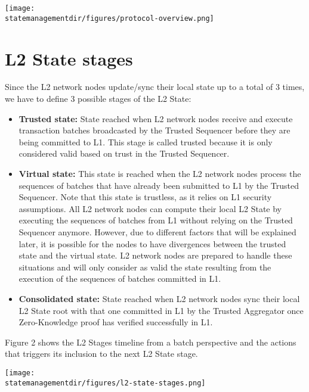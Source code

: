 \begin{center}
	\texttt{[image: \\statemanagementdir/figures/protocol-overview.png]}
	
\end{center}



\section{L2 State stages}

Since the L2 network nodes update/sync their local state up to a total of 3 times, we have to define 3 possible stages of the L2 State:

\begin{itemize}
	\item \textbf{Trusted state:} State reached when L2 network nodes receive and execute transaction batches broadcasted by the Trusted Sequencer before they are being committed to L1. This stage is called trusted because it is only considered valid based on trust in the Trusted Sequencer.
	

	\item \textbf{Virtual state:} This state is reached when the L2 network nodes process the sequences of batches that have already been submitted to L1 by the Trusted Sequencer. Note that this state is trustless, as it relies on L1 security assumptions. All L2 network nodes can compute their local L2 State by executing the sequences of batches from L1 without relying on the Trusted Sequencer anymore. However, due to different factors that will be explained later, it is possible for the nodes to have divergences between the trusted state and the virtual state. L2 network nodes are prepared to handle these situations and will only consider as valid the state resulting from the execution of the sequences of batches committed in L1.
	\item \textbf{Consolidated state:} State reached when L2 network nodes sync their local L2 State root with that one committed in L1 by the Trusted Aggregator once  Zero-Knowledge proof has verified successfully in L1.
	
\end{itemize}

Figure 2 shows the L2 Stages timeline from a batch perspective and the actions that triggers its inclusion to the next L2 State stage. 

\begin{center}
	\texttt{[image: \\statemanagementdir/figures/l2-state-stages.png]}
	
\end{center}

